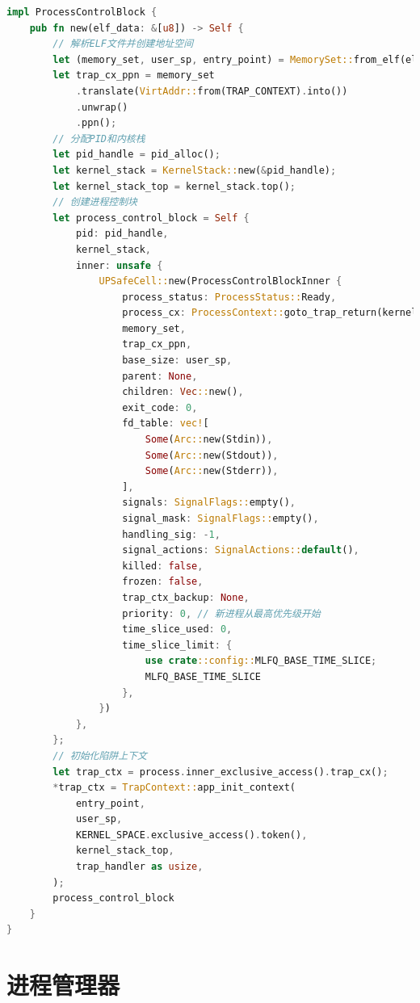 \begin{lstlisting}[language=Rust,caption={进程创建过程}, label={lst:process-creation}]
impl ProcessControlBlock {
    pub fn new(elf_data: &[u8]) -> Self {
        // 解析ELF文件并创建地址空间
        let (memory_set, user_sp, entry_point) = MemorySet::from_elf(elf_data);
        let trap_cx_ppn = memory_set
            .translate(VirtAddr::from(TRAP_CONTEXT).into())
            .unwrap()
            .ppn();
        // 分配PID和内核栈
        let pid_handle = pid_alloc();
        let kernel_stack = KernelStack::new(&pid_handle);
        let kernel_stack_top = kernel_stack.top();
        // 创建进程控制块
        let process_control_block = Self {
            pid: pid_handle,
            kernel_stack,
            inner: unsafe {
                UPSafeCell::new(ProcessControlBlockInner {
                    process_status: ProcessStatus::Ready,
                    process_cx: ProcessContext::goto_trap_return(kernel_stack_top),
                    memory_set,
                    trap_cx_ppn,
                    base_size: user_sp,
                    parent: None,
                    children: Vec::new(),
                    exit_code: 0,
                    fd_table: vec![
                        Some(Arc::new(Stdin)),
                        Some(Arc::new(Stdout)),
                        Some(Arc::new(Stderr)),
                    ],
                    signals: SignalFlags::empty(),
                    signal_mask: SignalFlags::empty(),
                    handling_sig: -1,
                    signal_actions: SignalActions::default(),
                    killed: false,
                    frozen: false,
                    trap_ctx_backup: None,
                    priority: 0, // 新进程从最高优先级开始
                    time_slice_used: 0,
                    time_slice_limit: {
                        use crate::config::MLFQ_BASE_TIME_SLICE;
                        MLFQ_BASE_TIME_SLICE
                    },
                })
            },
        };
        // 初始化陷阱上下文
        let trap_ctx = process.inner_exclusive_access().trap_cx();
        *trap_ctx = TrapContext::app_init_context(
            entry_point,
            user_sp,
            KERNEL_SPACE.exclusive_access().token(),
            kernel_stack_top,
            trap_handler as usize,
        );
        process_control_block
    }
}
\end{lstlisting}

\section{进程管理器}

